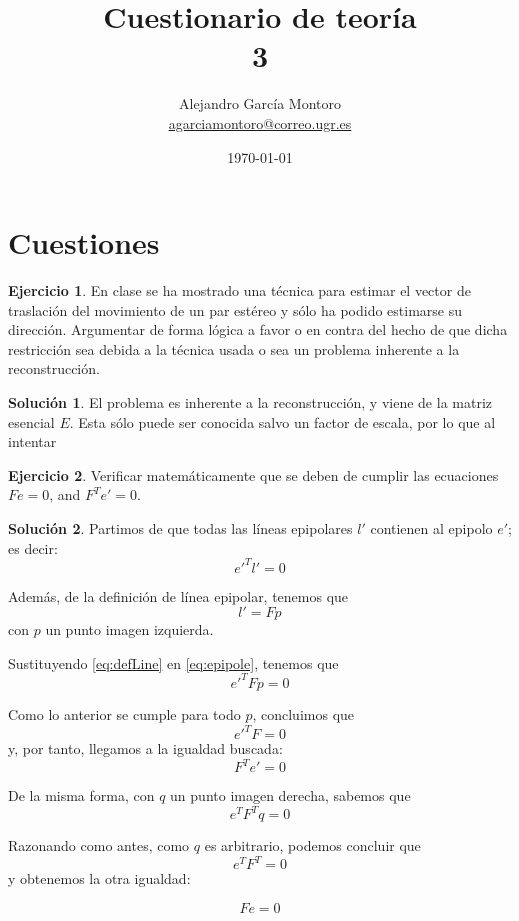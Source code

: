 \documentclass[a4paper, 11pt]{article}
\title{Cuestionario de teoría \\ 3}
\author{Alejandro García Montoro\\
    \href{mailto:agarciamontoro@correo.ugr.es}{agarciamontoro@correo.ugr.es}}
\date{\today}
\theoremstyle{definition}
\newtheorem{ejercicio}{Ejercicio}
\newtheorem*{solucion}{Solución}
\theoremstyle{theorem}
\begin{document}
    \maketitle

    \section{Cuestiones}

    \begin{ejercicio}
        En clase se ha mostrado una técnica para estimar el vector de traslación del movimiento de un par estéreo y sólo ha podido estimarse su dirección. Argumentar de forma lógica a favor o en contra del hecho de que dicha restricción sea debida a la técnica usada o sea un problema inherente a la reconstrucción.
    \end{ejercicio}

    \begin{solucion}
        El problema es inherente a la reconstrucción, y viene de la matriz esencial $E$. Esta sólo puede ser conocida salvo un factor de escala, por lo que al intentar
    \end{solucion}

    \begin{ejercicio}
        Verificar matemáticamente que se deben de cumplir las ecuaciones $Fe = 0$, and $F^T e' = 0$.
    \end{ejercicio}

    \begin{solucion}
        Partimos de que todas las líneas epipolares $l'$ contienen al epipolo $e'$; es decir:
        \begin{equation}
            e'^Tl' = 0
            \label{eq:epipole}
        \end{equation}

        Además, de la definición de línea epipolar, tenemos que
        \begin{equation}
            l' = Fp
            \label{eq:defLine}
        \end{equation}
        con $p$ un punto imagen izquierda.

        Sustituyendo \ref{eq:defLine} en \ref{eq:epipole}, tenemos que
        \[
            e'^TFp = 0
        \]

        Como lo anterior se cumple para todo $p$, concluimos que
        \[
            e'^TF = 0
        \]
        y, por tanto, llegamos a la igualdad buscada:
        \[
            F^T e' = 0
        \]

        De la misma forma, con $q$ un punto imagen derecha, sabemos que
        \[
            e^T F^T q = 0
        \]

        Razonando como antes, como $q$ es arbitrario, podemos concluir que
        \[
            e^T F^T = 0
        \]
        y obtenemos la otra igualdad:

        \[
            F e = 0
        \]


    \end{solucion}
\end{document}
